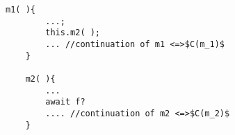 %
\begin{lstlisting}[caption=ABS Example, label=ex]
	m1( ){
		...;
		this.m2( );
		...	//continuation of m1 <=>$C(m_1)$
	}

	m2( ){
		...
		await f?
		.... //continuation of m2 <=>$C(m_2)$
	}
\end{lstlisting}



%

